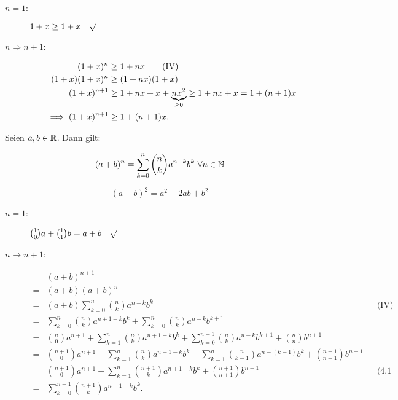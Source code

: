 \documentclass[a4paper,oneside,DIV15,BCOR12mm]{scrbook}
\begin{document}
\begin{beweis}
\begin{description}
\item[$n=1$:] $1+x\ge1+x\quad\surd$
\item[$n\Rightarrow n+1$:]
\begin{align*}
(1+x)^n&\ge1+nx\qquad\text{(IV)}\\
(1+x)(1+x)^n&\ge(1+nx)(1+x)\\
(1+x)^{n+1}&\ge1+nx+x+\underbrace{nx^2}_{\ge0}\ge1+nx+x=1+(n+1)x\\
\implies(1+x)^{n+1}&\ge1+(n+1)x\text{.}
\end{align*}
\end{description}
\end{beweis}

\begin{satz}
Seien $a,b\in\mathbb{R}$. Dann gilt:

\begin{displaymath}
(a+b)^n=\sum_{k=0}^n{\binom{n}{k}a^{n-k}b^k}\ \forall n\in\MdN
\end{displaymath}
\end{satz}

\begin{beispiel}
$$(a+b)^2=a^2+2ab+b^2$$
\end{beispiel}

\begin{beweis}
\begin{description}
\item[$n=1$:] $\binom{1}{0}a+\binom{1}{1}b=a+b\quad\surd$
\item[$n\longrightarrow n+1$:]
\begin{align*}
&(a+b)^{n+1}\\
=&(a+b)(a+b)^n\\
=&(a+b)\sum_{k=0}^n{\binom{n}{k}a^{n-k}b^k} && \text{(IV)}\\
=&\sum_{k=0}^n{\binom{n}{k}a^{n+1-k}b^k}+\sum_{k=0}^n{\binom{n}{k}a^{n-k}b^{k+1}}\\
=&\binom{n}{0}a^{n+1}+\sum_{k=1}^n{\binom{n}{k}a^{n+1-k}b^k}+\sum_{k=0}^{n-1}{\binom{n}{k}a^{n-k}b^{k+1}}+\binom{n}{n}b^{n+1}\\
=&\binom{n+1}{0}a^{n+1}+\sum_{k=1}^n{\binom{n}{k}a^{n+1-k}b^k}+\sum_{k=1}^{n}{\binom{n}{k-1}a^{n-(k-1)}b^{k}}+\binom{n+1}{n+1}b^{n+1}\\
=&\binom{n+1}{0}a^{n+1}+\sum_{k=1}^n{\binom{n+1}{k}a^{n+1-k}b^k}+\binom{n+1}{n+1}b^{n+1} && \text{(4.1 (2))}\\
=&\sum_{k=0}^{n+1}{\binom{n+1}{k}a^{n+1-k}b^k}\text{.}\\
\end{align*}
\end{description}
\end{beweis}
\end{document}
